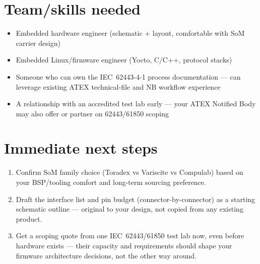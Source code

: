 \documentclass[11pt,a4paper]{article}
\begin{document}
\section{Team/skills needed}

\begin{itemize}[noitemsep]
  \item Embedded hardware engineer (schematic + layout, comfortable with SoM carrier design)
  \item Embedded Linux/firmware engineer (Yocto, C/C++, protocol stacks)
  \item Someone who can own the IEC~62443-4-1 process documentation --- can leverage existing ATEX technical-file and NB workflow experience
  \item A relationship with an accredited test lab early --- your ATEX Notified Body may also offer or partner on 62443/61850 scoping
\end{itemize}

\section{Immediate next steps}

\begin{enumerate}[leftmargin=*]
  \item Confirm SoM family choice (Toradex vs Variscite vs Compulab) based on your BSP/tooling comfort and long-term sourcing preference.
  \item Draft the interface list and pin budget (connector-by-connector) as a starting schematic outline --- original to your design,
        not copied from any existing product.
  \item Get a scoping quote from one IEC~62443/61850 test lab now, even before hardware exists --- their capacity and requirements should
        shape your firmware architecture decisions, not the other way around.
\end{enumerate}
\end{document}
